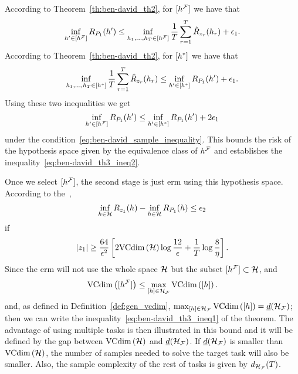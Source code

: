 According to Theorem~\ref{th:ben-david_th2}, for $\lbrack h^{\mathcal{F}}\rbrack$ we have that
\begin{equation}
    \nonumber
    {\inf_{h' \in \lbrack h^{\mathcal{F}}\rbrack}R_{P_1}(h')} \leq \inf_{h_1, \ldots, h_T \in \lbrack h^{\mathcal{F}}\rbrack} \frac{1}{T} \sum_{r=1}^T \hat{R}_{z_r}(h_r)  + \epsilon_1.
\end{equation}
According to Theorem~\ref{th:ben-david_th2}, for $\lbrack h^*\rbrack$ we have that
\begin{equation}
    \nonumber
    {\inf_{h_1, \ldots, h_T\in \lbrack h^*\rbrack} \frac{1}{T} \sum_{r=1}^T\hat{R}_{z_r}(h_r) \leq \inf_{h' \in \lbrack h^*\rbrack}R_{P_1}(h')}  + \epsilon_1.
\end{equation}
Using these two inequalities we get
\begin{equation}
    \nonumber
    \inf_{h' \in \lbrack h^{\mathcal{F}}\rbrack}R_{P_1}(h') \leq \inf_{h' \in \lbrack h^*\rbrack}R_{P_1}(h') + 2\epsilon_1 
\end{equation}
under the condition~\eqref{eq:ben-david_sample_inequality}. This bounds the risk of the hypothesis space given by the equivalence class of $h^{\mathcal{F}}$ and establishes the inequality~\eqref{eq:ben-david_th3_ineq2}.
%

Once we select $\lbrack h^{\mathcal{F}}\rbrack$, the second stage is just \acrshort{erm} using this hypothesis space.
%
According to the~\cite{vapnik1982estimation},
\begin{equation}\nonumber
    \inf_{h \in \mathcal{H}} R_{z_1}(h) - \inf_{h \in \mathcal{H}} R_{P_1}(h) \leq \epsilon_2
\end{equation}
if
\begin{equation}
    \nonumber
    \left|z_1\right| \geq  \frac{64}{\epsilon^2} \left[2 \text{VCdim}\left(\mathcal{H}\right) \log \frac{12}{\epsilon} + \frac{1}{T}\log\frac{8}{\eta} \right] .
\end{equation}
Since the \acrshort{erm} will not use the whole space $\mathcal{H}$ but the subset $\lbrack h^{\mathcal{F}}\rbrack \subset \mathcal{H}$, and
$$\text{VCdim}\left(\lbrack h^{\mathcal{F}}\rbrack\right) \leq \max_{\lbrack h\rbrack \in \mathcal{H}_{\mathcal{F}}} \text{VCdim}\left(\lbrack h\rbrack\right) .$$
and, as defined in Definition~\ref{def:gen_vcdim}, $\max_{\lbrack h\rbrack \in \mathcal{H}_{\mathcal{F}}} \text{VCdim}\left(\lbrack h\rbrack\right) = \underline{d}(\mathcal{H}_{\mathcal{F}})$;
 then we can write the inequality~\eqref{eq:ben-david_th3_ineq1} of the theorem.
%
The advantage of using multiple tasks is then illustrated in this bound and it will be defined by the gap between $\text{VCdim}\left(\mathcal{H}\right)$ and $\underline{d}(\mathcal{H}_{\mathcal{F}})$. If $\underline{d}(\mathcal{H}_{\mathcal{F}})$ is smaller than $\text{VCdim}\left(\mathcal{H}\right)$, the number of samples needed to solve the target task will also be smaller.
Also, the sample complexity of the rest of tasks is given by $d_{\mathcal{H}_{\mathcal{F}}}(T)$.

